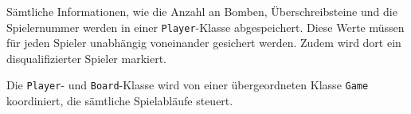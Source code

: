 S\"amtliche Informationen, wie die Anzahl an Bomben, \"Uberschreibsteine und die Spielernummer werden in einer \texttt{Player}-Klasse abgespeichert.
Diese Werte m\"ussen f\"ur jeden Spieler unabh\"angig voneinander gesichert werden.
Zudem wird dort ein disqualifizierter Spieler markiert.

Die \texttt{Player}- und \texttt{Board}-Klasse wird von einer \"ubergeordneten Klasse \texttt{Game} koordiniert, die s\"amtliche Spielabl\"aufe steuert.


\bigskip
\newpage